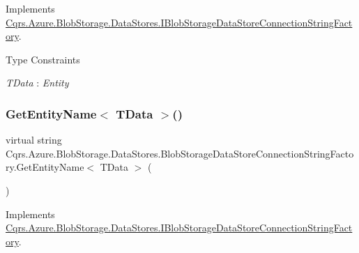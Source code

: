 Implements \hyperlink{interfaceCqrs_1_1Azure_1_1BlobStorage_1_1DataStores_1_1IBlobStorageDataStoreConnectionStringFactory_a7c86fb71e24cd75b848f67e6864689ae}{Cqrs.\+Azure.\+Blob\+Storage.\+Data\+Stores.\+I\+Blob\+Storage\+Data\+Store\+Connection\+String\+Factory}.

\begin{Desc}
\item[Type Constraints]\begin{description}
\item[{\em T\+Data} : {\em Entity}]\end{description}
\end{Desc}
\mbox{\label{classCqrs_1_1Azure_1_1BlobStorage_1_1DataStores_1_1BlobStorageDataStoreConnectionStringFactory_a0ece7f48e0305b8397b95308dfdf2532}} 
\subsubsection{\texorpdfstring{Get\+Entity\+Name$<$ T\+Data $>$()}{GetEntityName< TData >()}}
{\footnotesize\ttfamily virtual string Cqrs.\+Azure.\+Blob\+Storage.\+Data\+Stores.\+Blob\+Storage\+Data\+Store\+Connection\+String\+Factory.\+Get\+Entity\+Name$<$ T\+Data $>$ (\begin{DoxyParamCaption}{ }\end{DoxyParamCaption})\hspace{0.3cm}{\ttfamily [virtual]}}



Implements \hyperlink{interfaceCqrs_1_1Azure_1_1BlobStorage_1_1DataStores_1_1IBlobStorageDataStoreConnectionStringFactory_ad7f6480ea3fa6dfab0953f05c2c15f85}{Cqrs.\+Azure.\+Blob\+Storage.\+Data\+Stores.\+I\+Blob\+Storage\+Data\+Store\+Connection\+String\+Factory}.

